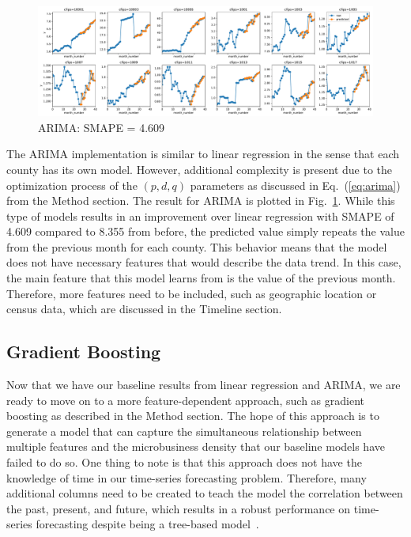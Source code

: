 \documentclass[prl,aps,superscriptaddress,twocolumn,10pt,nolongbibliography]{revtex4-2}
\begin{document}
\begin{figure}
\includegraphics[width=7in]{figs/arima.pdf}
\caption{\label{fig:arima}
ARIMA: SMAPE = 4.609
}
\end{figure}

The ARIMA implementation is similar to linear regression in the sense that each county has its own model. 
However, additional complexity is present due to the optimization process of the $(p, d, q)$ parameters as discussed in Eq.~(\ref{eq:arima}) from the Method section.
The result for ARIMA is plotted in Fig.~\ref{fig:arima}.
While this type of models results in an improvement over linear regression with SMAPE of 4.609 compared to 8.355 from before, the predicted value simply repeats the value from the previous month for each county.
This behavior means that the model does not have necessary features that would describe the data trend.
In this case, the main feature that this model learns from is the value of the previous month. 
Therefore, more features need to be included, such as geographic location or census data, which are discussed in the Timeline section.

\subsection{Gradient Boosting}
Now that we have our baseline results from linear regression and ARIMA, we are ready to move on to a more feature-dependent approach, such as gradient boosting as described in the Method section.
The hope of this approach is to generate a model that can capture the simultaneous relationship between multiple features and the microbusiness density that our baseline models have failed to do so. 
One thing to note is that this approach does not have the knowledge of time in our time-series forecasting problem. 
Therefore, many additional columns need to be created to teach the model the correlation between the past, present, and future, which results in a robust performance on time-series forecasting despite being a tree-based model~\cite{wojcik2018prognozowanie}.  
\end{document}
